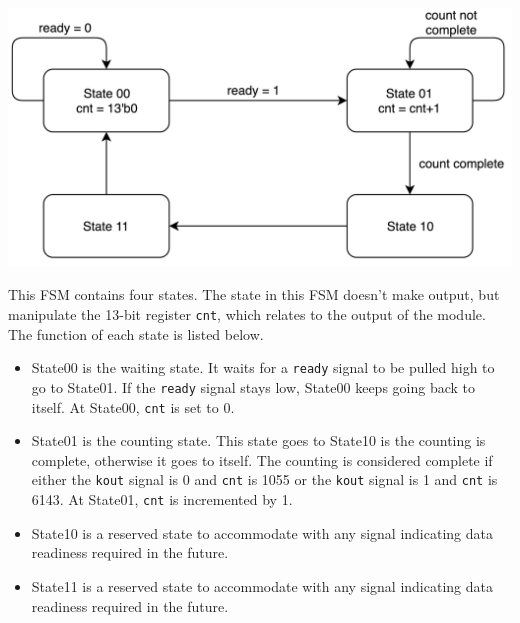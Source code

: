 \documentclass[letterpaper, 12pt]{article} %
\begin{document}
\begin{center}
    \includegraphics[width=14cm, angle=0]{fsm_cheng.png}
\end{center}

This FSM contains four states. The state in this FSM doesn't make output, but manipulate the 13-bit register \texttt{cnt}, which relates to the output of the module. The function of each state is listed below.

\begin{itemize}
\item State00 is the waiting state. It waits for a \texttt{ready} signal to be pulled high to go to State01. If the \texttt{ready} signal stays low, State00 keeps going back to itself. At State00, \texttt{cnt} is set to 0. 
\item State01 is the counting state. This state goes to State10 is the counting is complete, otherwise it goes to itself. The counting is considered complete if either the \texttt{kout} signal is 0 and \texttt{cnt} is 1055 or the \texttt{kout} signal is 1 and \texttt{cnt} is 6143. At State01, \texttt{cnt} is incremented by 1. 

\item State10 is a reserved state to accommodate with any signal indicating data readiness required in the future. 


\item State11 is a reserved state to accommodate with any signal indicating data readiness required in the future. 
\end{itemize}
\end{document}
